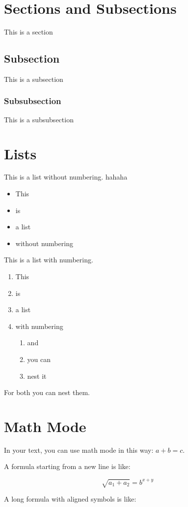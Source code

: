 \documentclass{article}[12pt]
\begin{document}
\date{}
\section{Sections and Subsections}
This is a section
\subsection{Subsection}
This is a subsection
\subsubsection{Subsubsection}
This is a subsubsection

\section{Lists}
This is a list without numbering.
hahaha
\begin{itemize}
  \item This
  \item is
  \item a list
  \item without numbering
\end{itemize}

This is a list with numbering.

\begin{enumerate}
  \item This
  \item is
  \item a list
  \item with numbering
  \begin{enumerate}
    \item and
    \item you can
    \item nest it
  \end{enumerate}
\end{enumerate}

For both you can nest them.

\section{Math Mode}
In your text, you can use math mode in this way: $a+b=c$.

A formula starting from a new line is like:

$$\sqrt{a_1+a_2}=b^{x+y}$$

A long formula with aligned symbols is like:
\end{document}
